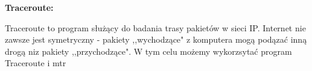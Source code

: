 \documentclass{article}
\begin{document}
\vspace{1\baselineskip}
\textbf{Traceroute: } \par
\vspace{1\baselineskip}
Traceroute to program służący do badania trasy pakietów w sieci IP. 
Internet nie zawsze jest symetryczny - pakiety ,,wychodzące" z komputera mogą podązać inną drogą niz pakiety ,,przychodzące". 
W tym celu możemy wykorzsytać program Traceroute i mtr
\end{document}
